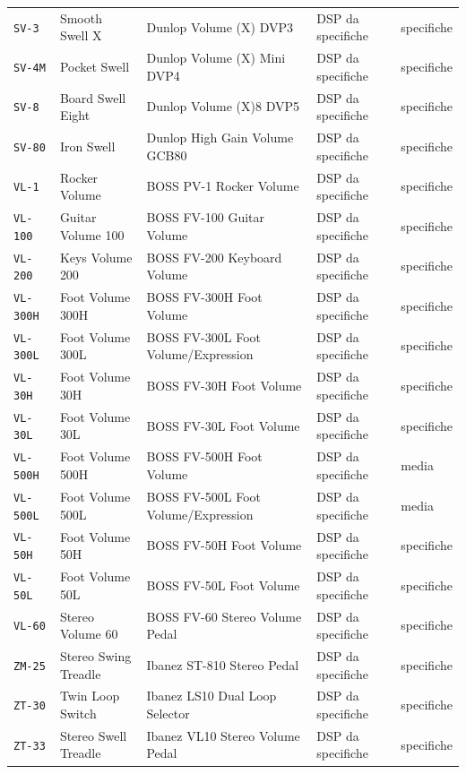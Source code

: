 \begin{xltabular}{\linewidth}{@{}l l X l l@{}}
\texttt{SV-3} & Smooth Swell X & Dunlop Volume (X) DVP3 & DSP da specifiche & specifiche\\
\texttt{SV-4M} & Pocket Swell & Dunlop Volume (X) Mini DVP4 & DSP da specifiche & specifiche\\
\texttt{SV-8} & Board Swell Eight & Dunlop Volume (X)8 DVP5 & DSP da specifiche & specifiche\\
\texttt{SV-80} & Iron Swell & Dunlop High Gain Volume GCB80 & DSP da specifiche & specifiche\\
\texttt{VL-1} & Rocker Volume & BOSS PV-1 Rocker Volume & DSP da specifiche & specifiche\\
\texttt{VL-100} & Guitar Volume 100 & BOSS FV-100 Guitar Volume & DSP da specifiche & specifiche\\
\texttt{VL-200} & Keys Volume 200 & BOSS FV-200 Keyboard Volume & DSP da specifiche & specifiche\\
\texttt{VL-300H} & Foot Volume 300H & BOSS FV-300H Foot Volume & DSP da specifiche & specifiche\\
\texttt{VL-300L} & Foot Volume 300L & BOSS FV-300L Foot Volume/Expression & DSP da specifiche & specifiche\\
\texttt{VL-30H} & Foot Volume 30H & BOSS FV-30H Foot Volume & DSP da specifiche & specifiche\\
\texttt{VL-30L} & Foot Volume 30L & BOSS FV-30L Foot Volume & DSP da specifiche & specifiche\\
\texttt{VL-500H} & Foot Volume 500H & BOSS FV-500H Foot Volume & DSP da specifiche & media\\
\texttt{VL-500L} & Foot Volume 500L & BOSS FV-500L Foot Volume/Expression & DSP da specifiche & media\\
\texttt{VL-50H} & Foot Volume 50H & BOSS FV-50H Foot Volume & DSP da specifiche & specifiche\\
\texttt{VL-50L} & Foot Volume 50L & BOSS FV-50L Foot Volume & DSP da specifiche & specifiche\\
\texttt{VL-60} & Stereo Volume 60 & BOSS FV-60 Stereo Volume Pedal & DSP da specifiche & specifiche\\
\texttt{ZM-25} & Stereo Swing Treadle & Ibanez ST-810 Stereo Pedal & DSP da specifiche & specifiche\\
\texttt{ZT-30} & Twin Loop Switch & Ibanez LS10 Dual Loop Selector & DSP da specifiche & specifiche\\
\texttt{ZT-33} & Stereo Swell Treadle & Ibanez VL10 Stereo Volume Pedal & DSP da specifiche & specifiche\\

\end{xltabular}
